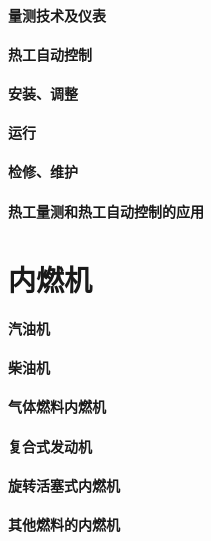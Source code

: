 \documentclass[UTF8]{../../ApplicationUniverse}
\begin{document}
\subsubsection{量测技术及仪表}
\subsubsection{热工自动控制}
\subsubsection{安装、调整}
\subsubsection{运行}
\subsubsection{检修、维护}
\subsubsection{热工量测和热工自动控制的应用}







\chapter{内燃机}
\subsubsection{汽油机}
\subsubsection{柴油机}
\subsubsection{气体燃料内燃机}
\subsubsection{复合式发动机}
\subsubsection{旋转活塞式内燃机}
\subsubsection{其他燃料的内燃机}
\end{document}
